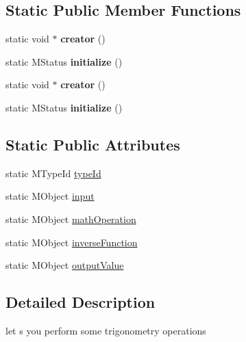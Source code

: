 \subsection*{Static Public Member Functions}
\begin{DoxyCompactItemize}
\item 
\hypertarget{class_m_g__trigonometry_a9a9c9fff9bbf2ab1f34a781e3289a802}{static void $\ast$ {\bfseries creator} ()}\label{class_m_g__trigonometry_a9a9c9fff9bbf2ab1f34a781e3289a802}

\item 
\hypertarget{class_m_g__trigonometry_a765dd745568862107f923765ebaf6f74}{static M\-Status {\bfseries initialize} ()}\label{class_m_g__trigonometry_a765dd745568862107f923765ebaf6f74}

\item 
\hypertarget{class_m_g__trigonometry_a9a9c9fff9bbf2ab1f34a781e3289a802}{static void $\ast$ {\bfseries creator} ()}\label{class_m_g__trigonometry_a9a9c9fff9bbf2ab1f34a781e3289a802}

\item 
\hypertarget{class_m_g__trigonometry_a765dd745568862107f923765ebaf6f74}{static M\-Status {\bfseries initialize} ()}\label{class_m_g__trigonometry_a765dd745568862107f923765ebaf6f74}

\end{DoxyCompactItemize}
\subsection*{Static Public Attributes}
\begin{DoxyCompactItemize}
\item 
static M\-Type\-Id \hyperlink{class_m_g__trigonometry_a9d74e233bd966adb8c060c4aae7a6576}{type\-Id}
\item 
static M\-Object \hyperlink{class_m_g__trigonometry_adf95381a397ca646e37a524dd4bae7fb}{input}
\item 
static M\-Object \hyperlink{class_m_g__trigonometry_a6be2c3fb2cfe5e7609eef7cd52802d6b}{math\-Operation}
\item 
static M\-Object \hyperlink{class_m_g__trigonometry_a92903c06ebef107b71b93812c7c358e3}{inverse\-Function}
\item 
static M\-Object \hyperlink{class_m_g__trigonometry_adde1f2175ff171bb94b96d6c3273f180}{output\-Value}
\end{DoxyCompactItemize}


\subsection{Detailed Description}
let s you perform some trigonometry operations 

